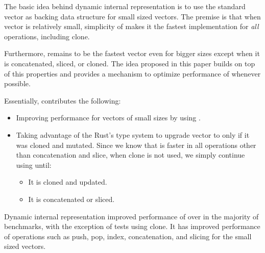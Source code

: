 
The basic idea behind dynamic internal representation is to use the standard vector as backing data structure for small sized vectors. The premise is that when vector is relatively small, simplicity of \stdvec{} makes it the fastest implementation for \emph{all} operations, including clone. 

Furthermore, \stdvec{} remains to be the fastest vector even for bigger sizes except when it is concatenated, sliced, or cloned. The idea proposed in this paper builds on top of this properties and provides a mechanism to optimize performance of \pvec{} whenever possible.

Essentially, \pvec{} contributes the following:
\begin{itemize}
    \item Improving performance for vectors of small sizes by using \stdvec{}.     
    \item Taking advantage of the Rust's type system to upgrade vector to \rrbvec{} only if it was cloned and mutated. Since we know that \stdvec{} is faster in all operations other than concatenation and slice, when clone is not used, we simply continue using \stdvec{} until: 
    \begin{itemize}
        \item It is cloned and updated. 
        \item It is concatenated or sliced. 
    \end{itemize}
\end{itemize}


Dynamic internal representation improved performance of \pvec{} over \rrbvec{} in the majority of benchmarks, with the exception of tests using clone. It has improved performance of operations such as push, pop, index, concatenation, and slicing for the small sized vectors.

